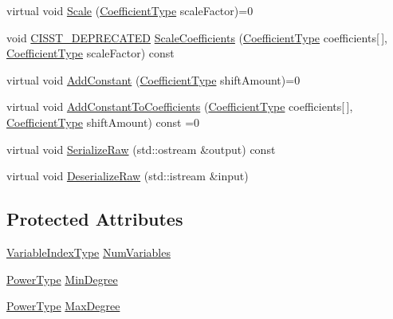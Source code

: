 \begin{DoxyCompactItemize}
\item 
virtual void \hyperlink{classnmr_polynomial_base_afe01d24b59008ee6bbb93d201dc585e6}{Scale} (\hyperlink{classnmr_polynomial_base_a8693efdfc8585ccb49abea69f74f3eef}{Coefficient\+Type} scale\+Factor)=0
\item 
void \hyperlink{cmn_portability_8h_a63da7164735f9501be651b1f2bbc0121}{C\+I\+S\+S\+T\+\_\+\+D\+E\+P\+R\+E\+C\+A\+T\+E\+D} \hyperlink{classnmr_polynomial_base_af620b263f1d97117bead1af1fc1e0379}{Scale\+Coefficients} (\hyperlink{classnmr_polynomial_base_a8693efdfc8585ccb49abea69f74f3eef}{Coefficient\+Type} coefficients\mbox{[}$\,$\mbox{]}, \hyperlink{classnmr_polynomial_base_a8693efdfc8585ccb49abea69f74f3eef}{Coefficient\+Type} scale\+Factor) const 
\item 
virtual void \hyperlink{classnmr_polynomial_base_a0ef8894033ea77d971fdf9a565061464}{Add\+Constant} (\hyperlink{classnmr_polynomial_base_a8693efdfc8585ccb49abea69f74f3eef}{Coefficient\+Type} shift\+Amount)=0
\item 
virtual void \hyperlink{classnmr_polynomial_base_ac539bd58986be490fb91970959e6ce93}{Add\+Constant\+To\+Coefficients} (\hyperlink{classnmr_polynomial_base_a8693efdfc8585ccb49abea69f74f3eef}{Coefficient\+Type} coefficients\mbox{[}$\,$\mbox{]}, \hyperlink{classnmr_polynomial_base_a8693efdfc8585ccb49abea69f74f3eef}{Coefficient\+Type} shift\+Amount) const =0
\item 
virtual void \hyperlink{classnmr_polynomial_base_a3663611e1e29322a62d7224babad4286}{Serialize\+Raw} (std\+::ostream \&output) const 
\item 
virtual void \hyperlink{classnmr_polynomial_base_a5c2c2a98bc2b230c1eddb437d5430259}{Deserialize\+Raw} (std\+::istream \&input)
\end{DoxyCompactItemize}
\subsection*{Protected Attributes}
\begin{DoxyCompactItemize}
\item 
\hyperlink{classnmr_polynomial_base_aae95477e451ddc7d3ee3f41cbdaadde2}{Variable\+Index\+Type} \hyperlink{classnmr_polynomial_base_ac8dad4ccf2d740abc1f4d3afe8e10cd2}{Num\+Variables}
\item 
\hyperlink{classnmr_polynomial_base_a58607c884bf2e6725a77ed4d9e14ba26}{Power\+Type} \hyperlink{classnmr_polynomial_base_a3380544a94773195706d04b22801cd6c}{Min\+Degree}
\item 
\hyperlink{classnmr_polynomial_base_a58607c884bf2e6725a77ed4d9e14ba26}{Power\+Type} \hyperlink{classnmr_polynomial_base_a33e3c6f203860a795be32d558fa05330}{Max\+Degree}
\end{DoxyCompactItemize}


